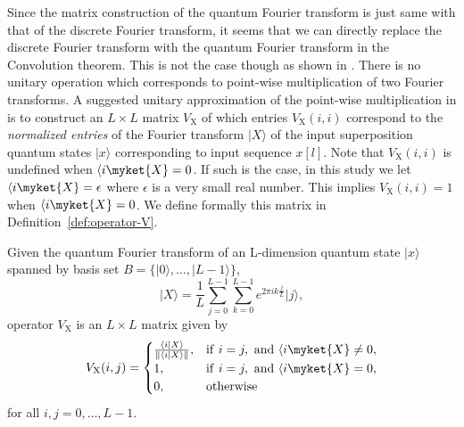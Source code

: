 Since the matrix construction of the quantum Fourier transform is just same with that of the discrete Fourier transform, it seems that we can directly replace the discrete Fourier transform with the quantum Fourier transform in the Convolution theorem. This is not the case though as shown in \cite{Lomont2003}. There is no unitary operation which corresponds to point-wise multiplication of two Fourier transforms. A suggested unitary approximation of the point-wise multiplication in \cite{Curtis2004} is to construct an $L \times L$ matrix $V_{\mathrm{X}}$ of which entries $V_{\mathrm{X}}(i,i)$ correspond to the \textit{normalized entries} of the Fourier transform $\vert X \rangle$ of the input superposition quantum states $\vert x \rangle$ corresponding to input sequence $x[l]$. Note that $V_{\mathrm{X}}(i,i)$ is undefined when $\langle i \myket{X} = 0$. If such is the case, in this study we let $\langle i \myket{X} = \epsilon$ where $\epsilon$ is a very small real number. This implies $V_{\mathrm{X}}(i,i) = 1$ when $\langle i \myket{X} = 0$. We define formally this matrix in Definition~\ref{def:operator-V}.

\begin{definition}\label{def:operator-V}
	Given the quantum Fourier transform of an L-dimension quantum state $\vert x \rangle$ spanned by basis set $B=\{\vert 0 \rangle,\ldots,\vert L-1 \rangle\}$,
	\[
		\vert X \rangle = \frac{1}{L} \sum_{j=0}^{L-1} \sum_{k=0}^{L-1} e^{2\pi i k \frac{j}{L} } \vert j \rangle,
	\]
	operator $V_{\mathrm{X}}$ is an $L \times L$ matrix given by
	\[
		V_{\mathrm{X}}(i,j) = 
		\begin{cases}
			\frac{\langle i \vert X \rangle}{\| \langle i \vert X \rangle \|}, & \mathrm{if\ } i=j,\mathrm{\ and\ } \langle i \myket{X} \neq 0,\\
			1,                                                                                       & \mathrm{if\ } i=j,\mathrm{\ and\ } \langle i \myket{X} = 0,\\
			0,                                                                                       & \mathrm{otherwise} 
		\end{cases}
	\]
	for all $i,j = 0,\ldots,L-1$.
\end{definition}

